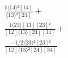 \documentclass[varwidth, border=5pt]{standalone}
\begin{document}
\begin{my}
$\begin{gathered}
\scriptscriptstyle\frac{1⟨14⟩²[14]}{⟨13⟩²[24]} +\\
\scriptscriptstyle\frac{1⟨23⟩[13][23]²}{[12]⟨13⟩[24][34]} +\\
\scriptscriptstyle\frac{-1/2⟨23⟩²[23]³}{[12]⟨13⟩²[24][34]} \phantom{+}
\end{gathered}$
\end{my}
\end{document}
